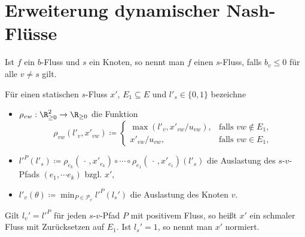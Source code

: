 \section{Erweiterung dynamischer Nash-Flüsse}

\begin{frame}
\begin{definition}
	Ist $f$ ein $b$-Fluss und $s$ ein Knoten, so nennt man $f$ einen $s$-Fluss, falls $b_v\leq 0$ für alle $v\neq s$ gilt.
\end{definition}

\pause\begin{definition}\label{def-thin-flow}
		Für einen statischen $s$-Fluss $x'$, $E_1\subseteq E$ und $l'_s\in\{ 0, 1 \}$ bezeichne
		\begin{itemize}[label=\color{darkblue}$\bullet$]
			\pause\item $\rho_{vw}: \R_{\geq 0}^2 \to \R_{\geq 0}$ die Funktion \[ \rho_{vw}(l'_v, x'_{vw}) \coloneq \begin{cases}
			\max(l'_v, x'_{vw} / u_{vw}), & \text{falls $vw\notin E_1$,}\\
			x'_{vw} / u_{vw}, & \text{falls $vw\in E_1$,}
			\end{cases}
			\]
			\item\pause $l'^P(l'_s)\coloneq \rho_{e_k}(\,\cdot\,, x'_{e_k}) \circ \cdots \circ \rho_{e_1}(\,\cdot\,, x'_{e_1}) (l'_s)$ die Auslastung des $s$-$v$-Pfads $(e_1, \cdots e_k)$ bzgl. $x'$,
			\item\pause $l'_v(\theta) \coloneq \min_{P\in\mathcal{P}_v} l'^P(l_s')$ die Auslastung des Knoten $v$.
		\end{itemize}
		\pause Gilt $l_v' = l'^P$ für jeden $s$-$v$-Pfad $P$ mit positivem Fluss, so heißt $x'$ ein schmaler Fluss mit Zurücksetzen auf $E_1$.
		Ist $l_s' = 1$, so nennt man $x'$ normiert.
	\end{definition}
\end{frame}

